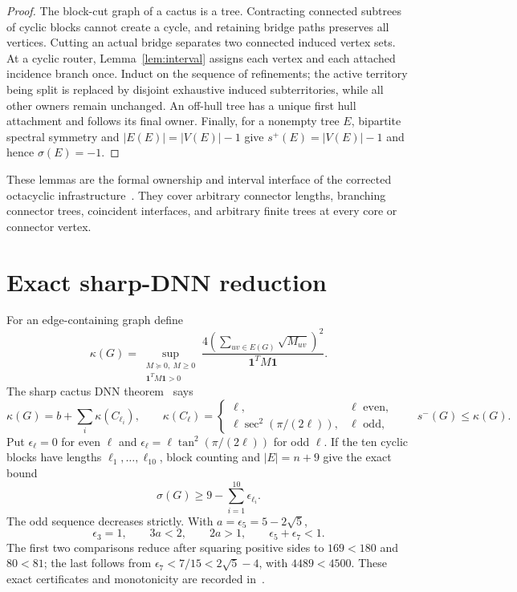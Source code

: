 \documentclass[11pt]{article}
\newcommand{\spE}{s^+}
\newcommand{\smE}{s^-}
\newcommand{\sig}{\sigma}
\newcommand{\one}{\mathbf 1}
\begin{document}
\begin{proof}
The block-cut graph of a cactus is a tree.  Contracting connected subtrees of
cyclic blocks cannot create a cycle, and retaining bridge paths preserves all
vertices.  Cutting an actual bridge separates two connected induced vertex
sets.  At a cyclic router, Lemma~\ref{lem:interval} assigns each vertex and
each attached incidence branch once.  Induct on the sequence of refinements;
the active territory being split is replaced by disjoint exhaustive induced
subterritories, while all other owners remain unchanged.  An off-hull tree has
a unique first hull attachment and follows its final owner.  Finally, for a
nonempty tree $E$, bipartite spectral symmetry and $|E(E)|=|V(E)|-1$ give
$\spE(E)=|V(E)|-1$ and hence $\sig(E)=-1$.
\end{proof}

These lemmas are the formal ownership and interval interface of the corrected
octacyclic infrastructure~\cite{Octacyclic}.  They cover arbitrary connector
lengths, branching connector trees, coincident interfaces, and arbitrary
finite trees at every core or connector vertex.

\section{Exact sharp-DNN reduction}

For an edge-containing graph define
\[
 \kappa(G)=\sup_{\substack{M\succeq0,\ M\geq0\\\one^TM\one>0}}
 \frac{4(\sum_{uv\in E(G)}\sqrt{M_{uv}})^2}{\one^TM\one}.
\]
The sharp cactus DNN theorem~\cite{DNN,LTZ} says
\[
 \kappa(G)=b+\sum_i\kappa(C_{\ell_i}),\qquad
 \kappa(C_\ell)=\begin{cases}
 \ell,&\ell\text{ even},\\
 \ell\sec^2(\pi/(2\ell)),&\ell\text{ odd},
 \end{cases}
 \qquad \smE(G)\leq\kappa(G).
\]
Put $\epsilon_\ell=0$ for even $\ell$ and
$\epsilon_\ell=\ell\tan^2(\pi/(2\ell))$ for odd $\ell$.  If the ten cyclic
blocks have lengths $\ell_1,\ldots,\ell_{10}$, block counting and $|E|=n+9$
give the exact bound
\begin{equation}\label{eq:dnn}
 \sig(G)\geq9-\sum_{i=1}^{10}\epsilon_{\ell_i}.
\end{equation}
The odd sequence decreases strictly.  With
$a=\epsilon_5=5-2\sqrt5$,
\[
 \epsilon_3=1,\qquad 3a<2,\qquad2a>1,
 \qquad\epsilon_5+\epsilon_7<1.
\]
The first two comparisons reduce after squaring positive sides to $169<180$
and $80<81$; the last follows from
$\epsilon_7<7/15<2\sqrt5-4$, with $4489<4500$.  These exact certificates and
monotonicity are recorded in~\cite{DNNResidual}.
\end{document}
